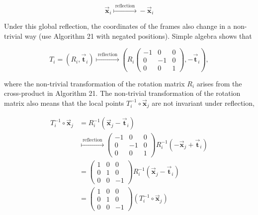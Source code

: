 \documentclass[10pt]{article}
\begin{document}
\begin{equation*}
\overrightarrow{\mathbf{x}}_{i} \stackrel{\text { reflection }}{\mapsto}-\overrightarrow{\mathbf{x}}_{i} \tag{10}
\end{equation*}


Under this global reflection, the coordinates of the frames also change in a non-trivial way (use Algorithm 21 with negated positions). Simple algebra shows that

\[
T_{i}=\left(R_{i}, \overrightarrow{\mathbf{t}}_{i}\right) \stackrel{\text { reflection }}{\mapsto}\left(R_{i}\left(\begin{array}{rrr}
-1 & 0 & 0  \tag{11}\\
0 & -1 & 0 \\
0 & 0 & 1
\end{array}\right),-\overrightarrow{\mathbf{t}}_{i}\right),
\]

where the non-trivial transformation of the rotation matrix $R_{i}$ arises from the cross-product in Algorithm 21. The non-trivial transformation of the rotation matrix also means that the local points $T_{i}^{-1} \circ \overrightarrow{\mathbf{x}}_{j}$ are not invariant under reflection,


\begin{align*}
T_{i}^{-1} \circ \overrightarrow{\mathbf{x}}_{j} & =R_{i}^{-1}\left(\overrightarrow{\mathbf{x}}_{j}-\overrightarrow{\mathbf{t}}_{i}\right)  \tag{12}\\
& \stackrel{\text { reflection }}{\mapsto}\left(\begin{array}{rrr}
-1 & 0 & 0 \\
0 & -1 & 0 \\
0 & 0 & 1
\end{array}\right) R_{i}^{-1}\left(-\overrightarrow{\mathbf{x}}_{j}+\overrightarrow{\mathbf{t}}_{i}\right)  \tag{13}\\
& =\left(\begin{array}{rrr}
1 & 0 & 0 \\
0 & 1 & 0 \\
0 & 0 & -1
\end{array}\right) R_{i}^{-1}\left(\overrightarrow{\mathbf{x}}_{j}-\overrightarrow{\mathbf{t}}_{i}\right)  \tag{14}\\
& =\left(\begin{array}{rrr}
1 & 0 & 0 \\
0 & 1 & 0 \\
0 & 0 & -1
\end{array}\right)\left(T_{i}^{-1} \circ \overrightarrow{\mathbf{x}}_{j}\right) \tag{15}
\end{align*}
\end{document}
